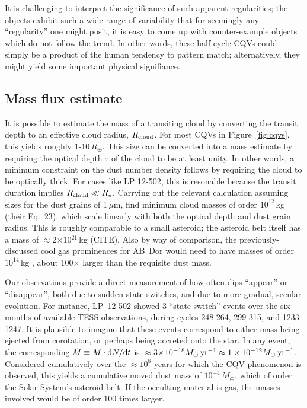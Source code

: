 \documentclass[11pt,twocolumn,tighten]{aastex63}
\begin{document}
It is challenging to interpret the significance of such apparent
regularities;  the objects exhibit such a wide range of variability
that for seemingly any ``regularity'' one might posit, it is easy to
come up with counter-example objects which do not follow the trend.
In other words, these half-cycle CQVs could simply be a
product of the human tendency to pattern match; alternatively, they
might yield some important physical signifiance.



\subsection{Mass flux estimate}

It is possible to estimate the mass of a transiting cloud by
converting the transit depth to an effective cloud radius, $R_{\rm
cloud}$.  For most CQVs in Figure~\ref{fig:cqvs}, this yields roughly
1-10\,$R_\oplus$.  This size can be converted into a mass estimate by
requiring the optical depth $\tau$ of the cloud to be at least unity.
In other words, a minimum constraint on the dust number density
follows by requiring the cloud to be optically thick.  For cases like
LP 12-502, this is resonable because the transit duration implies
$R_{\rm cloud}\ll R_\star$.  Carrying out the relevant calculation
assuming sizes for the dust grains of 1\,$\mu$m,
\citet{2023MNRAS.518.4734S} find minimum cloud masses of order
$10^{12}$\,kg (their Eq.~23), which scale linearly with both the
optical depth and dust grain radius.  This is roughly comparable to a
small asteroid; the asteroid belt itself has a mass of
$\approx$2$\times$10$^{21}$\,kg (CITE).  Also by way of comparison,
the previously-discussed cool gas prominences for AB~Dor would need to
have masses of order $10^{14}$\,kg \citep{1990MNRAS.247..415C}, about
100$\times$ larger than the requisite dust mass.

Our observations provide a direct measurement of how often dips
``appear'' or ``disappear'', both due to sudden state-switches, and
due to more gradual, secular evolution.  For instance, LP~12-502
showed 3 ``state-switch'' events over the six months of available TESS
observations, during cycles 248-264, 299-315, and 1233-1247.  It is
plausible to imagine that these events correspond to either mass being
ejected from corotation, or perhaps being accreted onto the star.  In
any event, the corresponding $\dot{M} \equiv M\cdot {\rm d}N/{\rm d}t$
is $\approx$3$\times$$10^{-18} M_\odot\,{\rm yr}^{-1} \approx
1\times10^{-12} M_\oplus\,{\rm yr}^{-1}$.  Considered cumulatively
over the $\approx$$10^8$ years for which the CQV phenomenon is
observed, this yields a cumulative moved dust mass of
$10^{-4}\,M_\oplus$, which of order the Solar System's asteroid belt.
If the occulting material is gas, the masses involved would be of
order 100 times larger.
\end{document}
